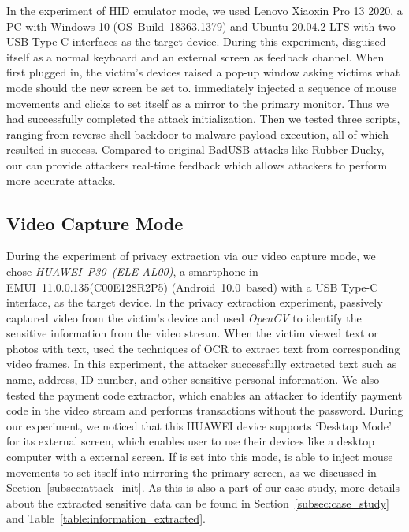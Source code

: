 In the experiment of HID emulator mode, we used {Lenovo Xiaoxin Pro 13
2020}, a PC with Windows 10 \mbox{(OS Build 18363.1379)} and Ubuntu 20.04.2 LTS with two \ac{USB} Type-C interfaces as the
target device. During this experiment, \tool disguised itself as a normal keyboard and an external screen as feedback channel. When first plugged in, the victim's devices raised a pop-up window asking victims what mode should the new screen be set to. \tool immediately injected a sequence of mouse movements and clicks to set itself as a mirror to the primary monitor. Thus we had successfully completed the attack initialization. Then we tested three scripts, ranging from reverse shell backdoor to malware payload execution, all of which resulted in success. Compared to original BadUSB attacks like Rubber Ducky, our \tool can provide attackers real-time feedback which allows attackers to perform more accurate attacks.


\subsection{Video Capture Mode}

During the experiment of privacy extraction via our video capture mode, we chose \mbox{\textit{HUAWEI P30 (ELE-AL00)}}, a
smartphone in \mbox{EMUI 11.0.0.135(C00E128R2P5)} \mbox{(Android 10.0 based)} with a \ac{USB} Type-C interface, as the
target device. In the privacy extraction experiment, \tool passively captured video
from the victim's device and used \textit{OpenCV} to identify the sensitive
information from the video stream.  When the victim viewed text or photos with
text, \tool used the techniques of \ac{OCR}  to
extract text from corresponding video frames. In this experiment, the attacker
successfully extracted text such as name, address, ID number, and other sensitive
personal information. We also tested the payment code extractor, which enables
an attacker to identify payment code in the video stream and performs transactions
without the password. During our experiment, we noticed that this HUAWEI device supports `Desktop Mode'
for its external screen, which enables user to use their devices like a desktop computer with a external screen.
If \tool is set into this mode, \tool is able to inject mouse movements to set itself into mirroring the primary screen, as we discussed in Section~\ref{subsec:attack_init}.
As this is also a part of our case study, more details about
the extracted sensitive data can be found in Section~\ref{subsec:case_study} and
Table~\ref{table:information_extracted}.

